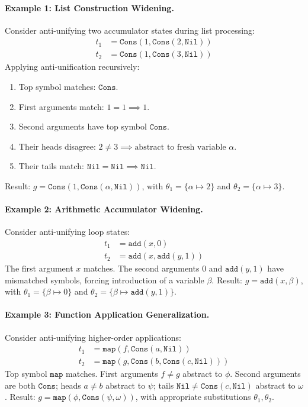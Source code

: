 \paragraph{Example 1: List Construction Widening.}
Consider anti-unifying two accumulator states during list processing:
\begin{align}
t_1 &= \mathtt{Cons}(1, \mathtt{Cons}(2, \mathtt{Nil})) \\
t_2 &= \mathtt{Cons}(1, \mathtt{Cons}(3, \mathtt{Nil}))
\end{align}
Applying anti-unification recursively:
\begin{enumerate}
    \item Top symbol matches: $\mathtt{Cons}$.
    \item First arguments match: $1 = 1 \implies 1$.
    \item Second arguments have top symbol $\mathtt{Cons}$.
    \item Their heads disagree: $2 \ne 3 \implies \text{abstract to fresh variable } \alpha$.
    \item Their tails match: $\mathtt{Nil} = \mathtt{Nil} \implies \mathtt{Nil}$.
\end{enumerate}
Result: $g = \mathtt{Cons}(1, \mathtt{Cons}(\alpha, \mathtt{Nil}))$, with $\theta_1 = \{\alpha \mapsto 2\}$ and $\theta_2 = \{\alpha \mapsto 3\}$.

\paragraph{Example 2: Arithmetic Accumulator Widening.}
Consider anti-unifying loop states:
\begin{align}
t_1 &= \mathtt{add}(x, 0) \\
t_2 &= \mathtt{add}(x, \mathtt{add}(y, 1))
\end{align}
The first argument $x$ matches. The second arguments $0$ and $\mathtt{add}(y, 1)$ have mismatched symbols, forcing introduction of a variable $\beta$.
Result: $g = \mathtt{add}(x, \beta)$, with $\theta_1 = \{\beta \mapsto 0\}$ and $\theta_2 = \{\beta \mapsto \mathtt{add}(y, 1)\}$.

\paragraph{Example 3: Function Application Generalization.}
Consider anti-unifying higher-order applications:
\begin{align}
t_1 &= \mathtt{map}(f, \mathtt{Cons}(a, \mathtt{Nil})) \\
t_2 &= \mathtt{map}(g, \mathtt{Cons}(b, \mathtt{Cons}(c, \mathtt{Nil})))
\end{align}
Top symbol $\mathtt{map}$ matches. First arguments $f \ne g$ abstract to $\phi$. Second arguments are both $\mathtt{Cons}$; heads $a \ne b$ abstract to $\psi$; tails $\mathtt{Nil} \ne \mathtt{Cons}(c, \mathtt{Nil})$ abstract to $\omega$.
Result: $g = \mathtt{map}(\phi, \mathtt{Cons}(\psi, \omega))$, with appropriate substitutions $\theta_1, \theta_2$.

